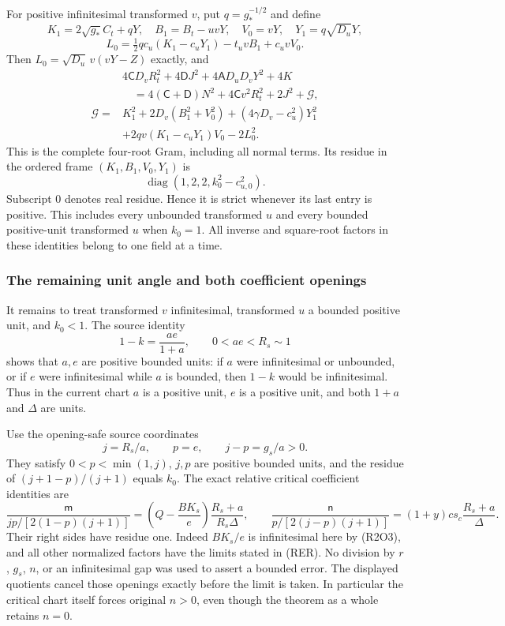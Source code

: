 For positive infinitesimal transformed $v$, put
$q=g_*^{-1/2}$ and define
\[
K_1=2\sqrt{g_*}C_t+qY,\quad
B_1=B_t-uvY,\quad V_0=vY,\quad Y_1=q\sqrt{D_u}Y,
\]
\[
L_0=\tfrac12q c_u(K_1-c_uY_1)-t_uvB_1+c_uvV_0.
\]
Then $L_0=\sqrt{D_u}\,v(vY-Z)$ exactly, and
\begin{align*}
&4\mathsf C D_vR_t^2+4\mathsf D J^2
       +4\mathsf A D_uD_vY^2+4K\\
&\quad=4(\mathsf C+\mathsf D)N^2+4\mathsf C v^2R_t^2
 +2J^2+\mathcal G,\\
\mathcal G={}&K_1^2+2D_v(B_1^2+V_0^2)
 +(4\gamma D_v-c_u^2)Y_1^2\\
&+2qv(K_1-c_uY_1)V_0-2L_0^2.
\tag{R2O11}
\end{align*}
This is the complete four-root Gram, including all normal terms.  Its
residue in the ordered frame $(K_1,B_1,V_0,Y_1)$ is
\[
\operatorname{diag}(1,2,2,k_0^2-c_{u,0}^2).
\tag{R2O12}
\]
Subscript $0$ denotes real residue.  Hence it is strict whenever its
last entry is positive.  This includes every unbounded transformed
$u$ and every bounded positive-unit transformed $u$ when $k_0=1$.
All inverse and square-root factors in these identities belong to one
field at a time.

\subsubsection*{The remaining unit angle and both coefficient openings}

It remains to treat transformed $v$ infinitesimal, transformed $u$ a
bounded positive unit, and $k_0<1$.  The source identity
\[
1-k=\frac{ae}{1+a},\qquad 0<ae<R_s\sim1
\tag{R2O13}
\]
shows that $a,e$ are positive bounded units: if $a$ were infinitesimal
or unbounded, or if $e$ were infinitesimal while $a$ is bounded, then
$1-k$ would be infinitesimal.  Thus in the current chart $a$ is a
positive unit, $e$ is a positive unit, and both $1+a$ and $\Delta$
are units.

Use the opening-safe source coordinates
\[
j=R_s/a,\qquad p=e,\qquad j-p=g_s/a>0.
\tag{R2O14}
\]
They satisfy $0<p<\min(1,j)$, $j,p$ are positive bounded units, and
the residue of $(j+1-p)/(j+1)$ equals $k_0$.  The exact relative
critical coefficient identities are
\[
\frac{\mathsf m}{jp/[2(1-p)(j+1)]}
 =\left(Q-\frac{BK_s}{e}\right)\frac{R_s+a}{R_s\Delta},
\qquad
\frac{\mathsf n}{p/[2(j-p)(j+1)]}
 =(1+y)c s_c\frac{R_s+a}{\Delta}.
\tag{R2O15}
\]
Their right sides have residue one.  Indeed $BK_s/e$ is infinitesimal
here by (R2O3), and all other normalized factors have the limits stated
in (RER).  No division by $r$, $g_s$, $n$, or an infinitesimal gap
was used to assert a bounded error.  The displayed quotients cancel
those openings exactly before the limit is taken.  In particular the
critical chart itself forces original $n>0$, even though the theorem
as a whole retains $n=0$.

